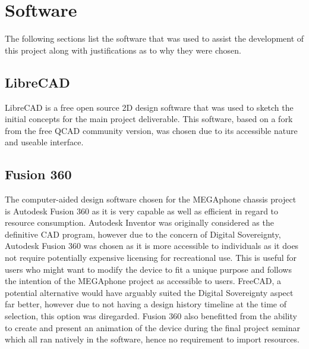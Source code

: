 \section{Software}

The following sections list the software that was used to assist the development of this project along with justifications as to why they were chosen.


\subsection{LibreCAD}

LibreCAD is a free open source 2D design software that was used to sketch the initial concepts for the main project deliverable. 
This software, based on a fork from the free QCAD community version, was chosen due to its accessible nature and useable interface.


\subsection{Fusion 360}

The computer-aided design software chosen for the MEGAphone chassis project is Autodesk Fusion 360 as it is very capable as well as efficient in regard to resource consumption. 
Autodesk Inventor was originally considered as the definitive CAD program, however due to the concern of Digital Sovereignty, Autodesk Fusion 360 was chosen as it is more accessible to individuals as it does not require potentially expensive licensing for recreational use. 
This is useful for users who might want to modify the device to fit a unique purpose and follows the intention of the MEGAphone project as accessible to users.
FreeCAD, a potential alternative would have arguably suited the Digital Sovereignty aspect far better, however due to not having a design history timeline at the time of selection, this option was diregarded.
Fusion 360 also benefitted from the ability to create and present an animation of the device during the final project seminar which all ran natively in the software, hence no requirement to import resources.


